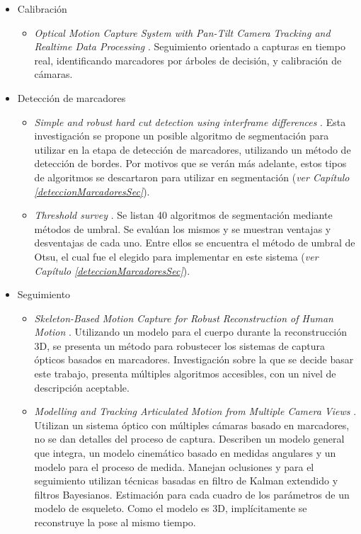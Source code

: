 \begin{itemize}
	\item Calibración
	\begin{itemize}
		\item \emph{Optical Motion Capture System with Pan-Tilt Camera Tracking and Realtime Data Processing} \cite{kurihara2002optical}. Seguimiento orientado a capturas en tiempo real, identificando marcadores por árboles de decisión, y calibración de cámaras.
	\end{itemize}
	\item Detección de marcadores
	\begin{itemize}
		\item \emph{Simple and robust hard cut detection using interframe differences} \cite{pardo2005simple}. Esta investigación se propone un posible algoritmo de segmentación para utilizar en la etapa de detección de marcadores, utilizando un método de detección de bordes. Por motivos que se verán más adelante, estos tipos de algoritmos se descartaron para utilizar en segmentación (\textit{ver Capítulo \ref{deteccionMarcadoresSec}}).
		\item \emph{Threshold survey} \cite{surveyThreshold}. Se listan 40 algoritmos de segmentación mediante métodos de umbral. Se evalúan los mismos y se muestran ventajas y desventajas de cada uno. Entre ellos se encuentra el método de umbral de Otsu\cite{otsu}, el cual fue el elegido para implementar en este sistema (\textit{ver Capítulo \ref{deteccionMarcadoresSec}}).
	\end{itemize}
	\item Seguimiento
	\begin{itemize}
		\item \emph{Skeleton-Based Motion Capture for Robust Reconstruction of Human Motion} \cite{herda}. Utilizando un modelo para el cuerpo durante la reconstrucción 3D, se presenta un método para robustecer los sistemas de captura ópticos basados en marcadores. Investigación sobre la que se decide basar este trabajo, presenta múltiples algoritmos accesibles, con un nivel de descripción aceptable.
		\item \emph{Modelling and Tracking Articulated Motion from Multiple Camera Views} \cite{ringer2000modelling}.
		Utilizan un sistema óptico con múltiples cámaras basado en marcadores, no se dan detalles del proceso de captura. Describen un modelo general que integra, un modelo cinemático basado en medidas angulares y un modelo para el proceso de medida. Manejan oclusiones y para el seguimiento utilizan técnicas basadas en filtro de Kalman extendido y filtros Bayesianos. Estimación para cada cuadro de los parámetros de un modelo de esqueleto. Como el modelo es 3D, implícitamente se reconstruye la pose al mismo tiempo.  		

\end{itemize}
\end{itemize}

